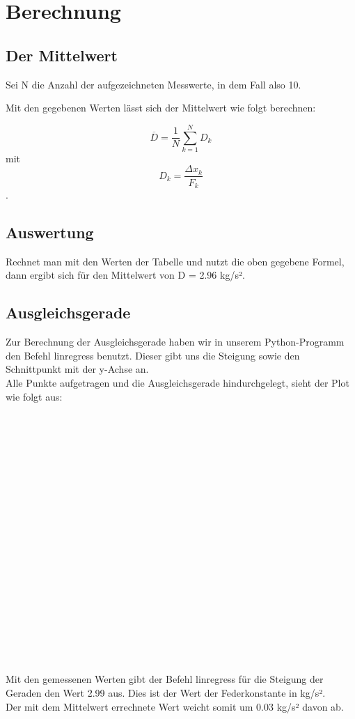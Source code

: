\documentclass[captions=tableheading]{scrartcl}
\begin{document}
\section{Berechnung}

\subsection{Der Mittelwert}

Sei N die Anzahl der aufgezeichneten Messwerte, in dem Fall also 10.

Mit den gegebenen Werten lässt sich der Mittelwert wie folgt berechnen:

\begin{equation}
\overline{D} = \frac{1}{N}\sum_{k=1}^N D_{k}
\end{equation}
mit 
\begin{equation}
D_{k} = \frac{\Delta x_{k}}{F_{k}}
\end{equation}
.
\newpage
\subsection{Auswertung}

Rechnet man mit den Werten der Tabelle und nutzt die oben gegebene Formel, dann ergibt sich für den Mittelwert von D =
2.96 kg/s².

\subsection{Ausgleichsgerade}

Zur Berechnung der Ausgleichsgerade haben wir in unserem Python-Programm den Befehl linregress benutzt.
Dieser gibt uns die Steigung sowie den Schnittpunkt mit der y-Achse an.\\
Alle Punkte aufgetragen und die Ausgleichsgerade hindurchgelegt, sieht der Plot wie folgt aus: \\
\\ \\ \\ \\ \\ \\ \\ \\ \\ \\ \\ \\ \\ \\ \\ \\ \\ \\ \\
\begin{figure}

\end{figure}


Mit den gemessenen Werten gibt der Befehl linregress für die Steigung der Geraden den Wert 2.99 aus.
Dies ist der Wert der Federkonstante in kg/s².\\
Der mit dem Mittelwert errechnete Wert weicht somit um 0.03 kg/s² davon ab.
\end{document}
